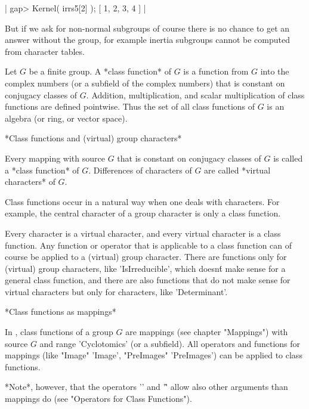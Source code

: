 |    gap> Kernel( irrs5[2] );
    [ 1, 2, 3, 4 ] |
    
But if we ask for non-normal subgroups of course there is no chance to get
an answer without the group, for example inertia subgroups cannot be
computed from character tables.


Let $G$ be a finite group.  A *class function* of $G$ is a function from
$G$ into the complex numbers (or a subfield of the complex numbers) that is
constant on conjugacy classes of $G$.
Addition, multiplication, and scalar multiplication of class functions are
defined pointwise.  Thus the set of all class functions of $G$ is an
algebra (or ring, or vector space).

\vspace{3mm}

*Class functions and (virtual) group characters*

Every mapping with source $G$ that is constant on conjugacy classes of $G$
is called a *class function* of $G$.
Differences of characters of $G$ are called *virtual characters* of $G$.

Class functions occur in a natural way when one deals with characters.
For example, the central character of a group character is only a class
function.

Every character is a virtual character, and every virtual character is a
class function.
Any function or operator that is applicable to a class function can of
course be applied to a (virtual) group character.  There are functions
only for (virtual) group characters, like 'IsIrreducible', which doesn\'t
make sense for a general class function, and there are also functions
that do not make sense for virtual characters but only for characters,
like 'Determinant'.

\vspace{3mm}

*Class functions as mappings*

In {\GAP}, class functions of a group $G$ are mappings (see chapter
"Mappings") with source $G$ and range 'Cyclotomics' (or a subfield).
All operators and functions for mappings (like "Image" 'Image', "PreImages"
'PreImages') can be applied to class functions.

*Note*, however, that the operators '\*' and '\^' allow also other
arguments than mappings do (see "Operators for Class Functions").

